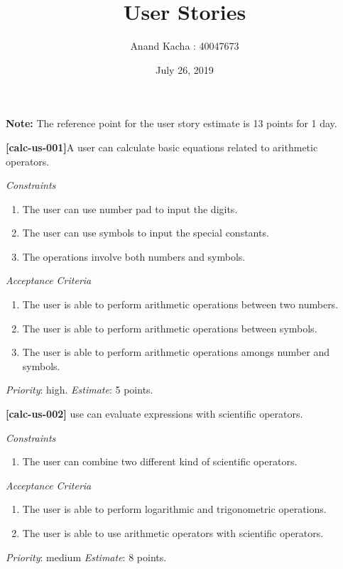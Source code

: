 \documentclass{article}
\title{User Stories}
\author{Anand Kacha : 40047673}
\date{July 26, 2019}
\begin{document}
\maketitle

\begin{flushleft}
\textbf{Note:} The reference point for the user story estimate is 13 points for 1 day.
\end{flushleft}

\begin{flushleft}
\textbf{[calc-us-001]}A user can calculate basic equations related to arithmetic operators.
\end{flushleft}
\textit{Constraints}
\begin{enumerate}
    \item The user can use number pad to input the digits.
    \item The user can use symbols to input the special constants.
    \item The operations involve both numbers and symbols.
\end{enumerate}
\textit{Acceptance Criteria}
\begin{enumerate}
    \item The user is able to perform arithmetic operations between two numbers.
    \item The user is able to perform arithmetic operations between symbols.
    \item The user is able to perform arithmetic operations amongs number and symbols.
\end{enumerate}
\textit{Priority}: high. \newline
\textit{Estimate}: 5 points.

\begin{flushleft}
\textbf{[calc-us-002]} use can evaluate expressions with scientific operators.
\end{flushleft}
\textit{Constraints}
\begin{enumerate}
    \item The user can combine two different kind of scientific operators.
\end{enumerate}
\newline
\textit{Acceptance Criteria}
\begin{enumerate}
    \item The user is able to perform logarithmic and trigonometric operations.
    \item The user is able to use arithmetic operators with scientific operators.
\end{enumerate}
\textit{Priority}: medium \newline
\textit{Estimate}: 8 points.
\end{document}
